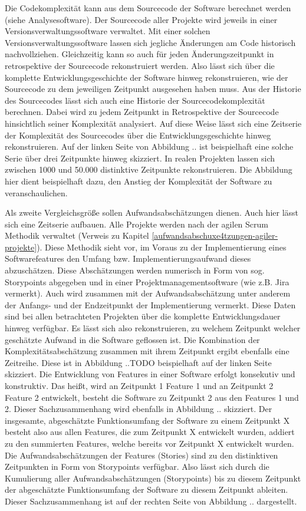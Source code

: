 Die Codekomplexität kann aus dem Sourcecode der Software berechnet
werden (siehe Analysesoftware). Der Sourcecode aller Projekte wird
jeweils in einer Versionsverwaltungssoftware verwaltet. Mit einer
solchen Versionsverwaltungssoftware lassen sich jegliche Änderungen am
Code historisch nachvollziehen. Gleichzeitig kann so auch für jeden
Änderungszeitpunkt in retrospektive der Sourcecode rekonstruiert
werden. Also lässt sich über die komplette
Entwicklungsgeschichte der Software hinweg rekonstruieren, wie der
Sourcecode zu dem jeweiligen Zeitpunkt ausgesehen haben muss. Aus der
Historie des Sourcecodes lässt sich auch eine Historie der
Sourcecodekomplexität berechnen. Dabei wird zu jedem Zeitpunkt in
Retrospektive der Sourcecode hinsichtlich seiner Komplexität analysiert.
Auf diese Weise lässt sich eine Zeitserie der Komplexität des
Sourcecodes über die Entwicklungsgeschichte hinweg rekonstruieren. Auf
der linken Seite von Abbildung .. ist beispielhaft eine solche Serie
über drei Zeitpunkte hinweg skizziert. In realen Projekten lassen sich
zwischen 1000 und 50.000 distinktive Zeitpunkte rekonstruieren. Die
Abbildung hier dient beispielhaft dazu, den Anstieg der Komplexität der
Software zu veranschaulichen.

Als zweite Vergleichsgrö\ss e sollen Aufwandsabschätzungen dienen. Auch
hier lässt sich eine Zeitserie aufbauen. Alle Projekte werden nach der
agilen Scrum Methodik verwaltet (Verweis zu Kapitel \ref{aufwandsabschuxe4tzungen-agiler-projekte}). Diese Methodik
sieht vor, im Voraus zu der Implementierung eines Softwarefeatures den
Umfang bzw. Implementierungsaufwand dieses abzuschätzen. Diese
Abschätzungen werden numerisch in Form von sog. Storypoints abgegeben
und in einer Projektmanagementsoftware (wie z.B. Jira vermerkt). Auch
wird zusammen mit der Aufwandsabschätzung unter anderem der Anfangs- und
der Endzeitpunkt der Implementierung vermerkt. Diese Daten sind bei
allen betrachteten Projekten über die komplette Entwicklungsdauer hinweg
verfügbar. Es lässt sich also rekonstruieren, zu welchem Zeitpunkt
welcher geschätzte Aufwand in die Software geflossen ist. Die
Kombination der Komplexitätsabschätzung zusammen mit ihrem Zeitpunkt
ergibt ebenfalls eine Zeitreihe. Diese ist in Abbildung ..TODO beispielhaft
auf der linken Seite skizziert. Die Entwicklung von Features in einer
Software erfolgt konsekutiv und konstruktiv. Das hei\ss t, wird an
Zeitpunkt 1 Feature 1 und an Zeitpunkt 2 Feature 2 entwickelt, besteht
die Software zu Zeitpunkt 2 aus den Features 1 und 2. Dieser
Sachzusammenhang wird ebenfalls in Abbildung .. skizziert. Der
insgesamte, abgeschätzte Funktionsumfang der Software zu einem Zeitpunkt
X besteht also aus allen Features, die zum Zeitpunkt X entwickelt
wurden, addiert zu den summierten Features, welche bereits vor Zeitpunkt
X entwickelt wurden. Die Aufwandsabschätzungen der Features (Stories)
sind zu den distinktiven Zeitpunkten in Form von Storypoints verfügbar.
Also lässt sich durch die Kumulierung aller Aufwandsabschätzungen
(Storypoints) bis zu diesem Zeitpunkt der abgeschätzte Funktionsumfang
der Software zu diesem Zeitpunkt ableiten. Dieser Sachzusammenhang ist
auf der rechten Seite von Abbildung .. dargestellt.

